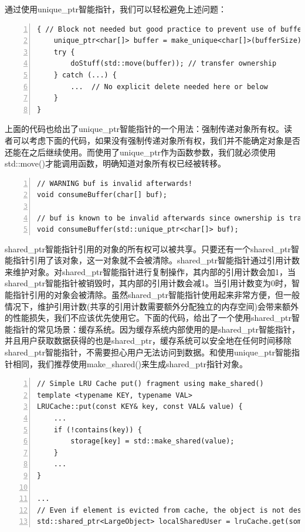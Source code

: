 \documentclass{ctexart}
\begin{document}
通过使用unique\_ptr智能指针，我们可以轻松避免上述问题：


\begin{lstlisting}[language={[ANSI]C},keywordstyle=\color{blue!70},commentstyle=\color{red!50!green!50!blue!50},frame=shadowbox, rulesepcolor=\color{red!20!green!20!blue!20},basicstyle=\small,numbers=left, numberstyle=\tiny,breaklines=true]
{ // Block not needed but good practice to prevent use of buffer after move  
	unique_ptr<char[]> buffer = make_unique<char[]>(bufferSize);    
	try {  
		doStuff(std::move(buffer)); // transfer ownership   
	} catch (...) {  
		...  // No explicit delete needed here or below   
	}  
}
\end{lstlisting}

上面的代码也给出了unique\_ptr智能指针的一个用法：强制传递对象所有权。读者可以考虑下面的代码，如果没有强制传递对象所有权，我们并不能确定对象是否还能在之后继续使用。而使用了unique\_ptr作为函数参数，我们就必须使用std::move()才能调用函数，明确知道对象所有权已经被转移。

\begin{lstlisting}[language={[ANSI]C},keywordstyle=\color{blue!70},commentstyle=\color{red!50!green!50!blue!50},frame=shadowbox, rulesepcolor=\color{red!20!green!20!blue!20},basicstyle=\small,numbers=left, numberstyle=\tiny,breaklines=true]
// WARNING buf is invalid afterwards!  
void consumeBuffer(char[] buf);  

// buf is known to be invalid afterwards since ownership is transferred
void consumeBuffer(std::unique_ptr<char[]> buf);
\end{lstlisting}

shared\_ptr智能指针引用的对象的所有权可以被共享。只要还有一个shared\_ptr智能指针引用了该对象，这一对象就不会被清除。shared\_ptr智能指针通过引用计数来维护对象。对shared\_ptr智能指针进行复制操作，其内部的引用计数会加1，当shared\_ptr智能指针被销毁时，其内部的引用计数会减1。当引用计数变为0时，智能指针引用的对象会被清除。虽然shared\_ptr智能指针使用起来非常方便，但一般情况下，维护引用计数(共享的引用计数需要额外分配独立的内存空间)会带来额外的性能损失，我们不应该优先使用它。下面的代码，给出了一个使用shared\_ptr智能指针的常见场景：缓存系统。因为缓存系统内部使用的是shared\_ptr智能指针，并且用户获取数据获得的也是shared\_ptr，缓存系统可以安全地在任何时间移除shared\_ptr智能指针，不需要担心用户无法访问到数据。和使用unique\_ptr智能指针相同，我们推荐使用make\_shared()来生成shared\_ptr指针对象。

\begin{lstlisting}[language={[ANSI]C},keywordstyle=\color{blue!70},commentstyle=\color{red!50!green!50!blue!50},frame=shadowbox, rulesepcolor=\color{red!20!green!20!blue!20},basicstyle=\small,numbers=left, numberstyle=\tiny,breaklines=true]
// Simple LRU Cache put() fragment using make_shared()  
template <typename KEY, typename VAL>  
LRUCache::put(const KEY& key, const VAL& value) {  
	...  
	if (!contains(key)) {  
		storage[key] = std::make_shared(value);  
	}
	...
}

...  
// Even if element is evicted from cache, the object is not destroyed, as it's shared  
std::shared_ptr<LargeObject> localSharedUser = lruCache.get(someKey);
\end{lstlisting}
\end{document}
